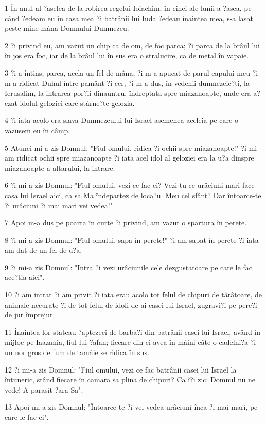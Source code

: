 \par 1 În anul al ?aselea de la robirea regelui Ioiachim, în cinci ale lunii a ?asea, pe când ?edeam eu în casa mea ?i batrânii lui Iuda ?edeau înaintea mea, s-a lasat peste mine mâna Domnului Dumnezeu.
\par 2 ?i privind eu, am vazut un chip ca de om, de foc parca; ?i parca de la brâul lui în jos era foc, iar de la brâul lui în sus era o stralucire, ca de metal în vapaie.
\par 3 ?i a întins, parca, acela un fel de mâna, ?i m-a apucat de parul capului meu ?i m-a ridicat Duhul între pamânt ?i cer, ?i m-a dus, în vedenii dumnezeie?ti, la Ierusalim, la intrarea por?ii dinauntru, îndreptata spre miazanoapte, unde era a?ezat idolul geloziei care stârne?te gelozia.
\par 4 ?i iata acolo era slava Dumnezeului lui Israel asemenea aceleia pe care o vazusem eu în câmp.
\par 5 Atunci mi-a zis Domnul: "Fiul omului, ridica-?i ochii spre miazanoapte!" ?i mi-am ridicat ochii spre miazanoapte ?i iata acel idol al geloziei era la u?a dinspre miazanoapte a altarului, la intrare.
\par 6 ?i mi-a zis Domnul: "Fiul omului, vezi ce fac ei? Vezi tu ce urâciuni mari face casa lui Israel aici, ca sa Ma îndepartez de loca?ul Meu cel sfânt? Dar întoarce-te ?i urâciuni ?i mai mari vei vedea!"
\par 7 Apoi m-a dus pe poarta în curte ?i privind, am vazut o spartura în perete.
\par 8 ?i mi-a zis Domnul: "Fiul omului, sapa în perete!" ?i am sapat în perete ?i iata am dat de un fel de u?a.
\par 9 ?i mi-a zis Domnul: "Intra ?i vezi urâciunile cele dezgustatoare pe care le fac ace?tia aici".
\par 10 ?i am intrat ?i am privit ?i iata erau acolo tot felul de chipuri de târâtoare, de animale necurate ?i de tot felul de idoli de ai casei lui Israel, zugravi?i pe pere?i de jur împrejur.
\par 11 Înaintea lor stateau ?aptezeci de barba?i din batrânii casei lui Israel, având în mijloc pe Iaazania, fiul lui ?afan; fiecare din ei avea în mâini câte o cadelni?a ?i un nor gros de fum de tamâie se ridica în sus.
\par 12 ?i mi-a zis Domnul: "Fiul omului, vezi ce fac batrânii casei lui Israel la întuneric, stând fiecare în camara sa plina de chipuri? Ca î?i zic: Domnul nu ne vede! A parasit ?ara Sa".
\par 13 Apoi mi-a zis Domnul: "Întoarce-te ?i vei vedea urâciuni înca ?i mai mari, pe care le fac ei".
